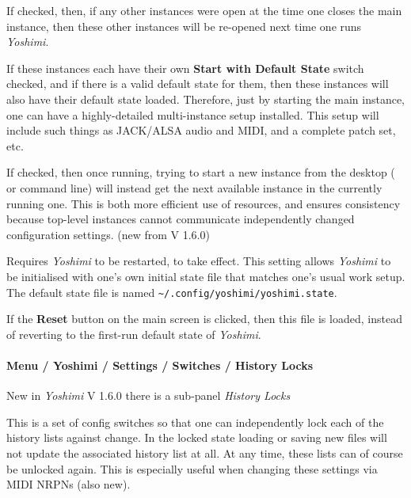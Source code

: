       If checked, then, if any other instances were open at the time one closes
      the main instance, then these other instances will be re-opened next time
      one runs \textsl{Yoshimi}.

   If these instances each have their own
   \textbf{Start with Default State} switch checked, and if
   there is a valid default state for them, then these instances will also have
   their default state loaded.
   Therefore, just by starting the main instance, one can have a
   highly-detailed multi-instance setup installed.
   This setup will include such things as JACK/ALSA audio
   and MIDI, and a complete patch set, etc.

      If checked, then once running, trying to start a new instance from the
      desktop ( or command line) will instead get the next available instance in
      the currently running one. This is both more efficient use of resources,
      and ensures consistency because top-level instances cannot communicate
      independently changed configuration settings. (new from V 1.6.0)

   Requires \textsl{Yoshimi} to be restarted, to take effect.
   This setting allows \textsl{Yoshimi} to be initialised with one's own
   initial state file that matches one's usual work setup.
   The default state file is named
   \texttt{\textasciitilde/.config/yoshimi/yoshimi.state}.

   If the \textbf{Reset} button on the main screen is clicked, then this file
   is loaded, instead of reverting to the first-run default state of
   \textsl{Yoshimi}.

   \paragraph{Menu / Yoshimi / Settings / Switches / History Locks}
   \label{paragraph:menu_yoshimi_settings_historylocks}
   New in \textsl{Yoshimi} V 1.6.0 there is a sub-panel \textsl{History Locks}

   This is a set of config switches so that one can independently lock each of
   the history lists against change. In the locked state loading or saving new
   files will not update the associated history list at all. At any time, these
   lists can of course be unlocked again. This is especially useful when changing
   these settings via MIDI NRPNs (also new).

